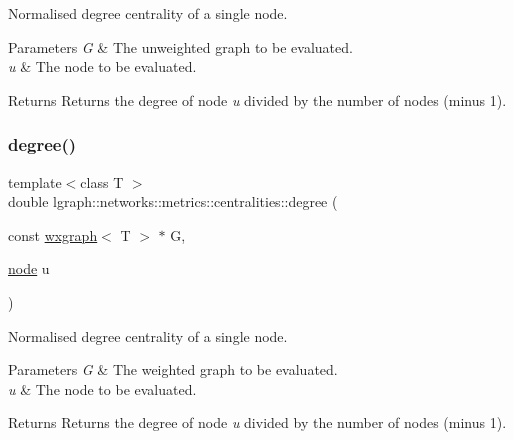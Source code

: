 Normalised degree centrality of a single node. 


\begin{DoxyParams}{Parameters}
{\em G} & The unweighted graph to be evaluated. \\
\hline
{\em u} & The node to be evaluated. \\
\hline
\end{DoxyParams}
\begin{DoxyReturn}{Returns}
Returns the degree of node {\itshape u} divided by the number of nodes (minus 1). 
\end{DoxyReturn}
\mbox{\label{namespacelgraph_1_1networks_1_1metrics_1_1centralities_ab069253de07dc54020e9d6cc1a27a6c8}} 
\subsubsection{\texorpdfstring{degree()}{degree()}\hspace{0.1cm}{\footnotesize\ttfamily [2/4]}}
{\footnotesize\ttfamily template$<$class T $>$ \\
double lgraph\+::networks\+::metrics\+::centralities\+::degree (\begin{DoxyParamCaption}\item[{const \hyperlink{classlgraph_1_1wxgraph}{wxgraph}$<$ T $>$ $\ast$}]{G,  }\item[{\hyperlink{namespacelgraph_a397169dd66adf725210a30fb7251773e}{node}}]{u }\end{DoxyParamCaption})}



Normalised degree centrality of a single node. 


\begin{DoxyParams}{Parameters}
{\em G} & The weighted graph to be evaluated. \\
\hline
{\em u} & The node to be evaluated. \\
\hline
\end{DoxyParams}
\begin{DoxyReturn}{Returns}
Returns the degree of node {\itshape u} divided by the number of nodes (minus 1). 
\end{DoxyReturn}
\mbox{\label{namespacelgraph_1_1networks_1_1metrics_1_1centralities_a371fb57a5a7b42017baa3ef52a9e28a6}} 
